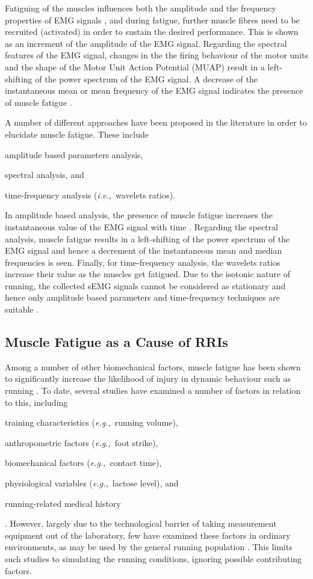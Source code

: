 \documentclass[letterpaper, 10 pt, conference]{ieeeconf}
\newcommand{\il}[1]{\begin{enumerate*}[label=(\roman*),mode=unboxed]#1\end{enumerate*}}
\newcommand{\eg}[1]{\textit{e.g.,}~#1} \newcommand{\ie}[1]{\textit{i.e.,}~#1}
\begin{document}
Fatiguing of the muscles influences both the amplitude and the frequency
properties of EMG signals \cite{de1997use}, and during fatigue, further muscle
fibres need to be recruited (activated) in order to sustain the desired
performance. This is shown as an increment of the amplitude of the EMG signal.
Regarding the spectral features of the EMG signal, changes in the the firing
behaviour of the motor units and the shape of the Motor Unit Action Potential
(MUAP) result in a left-shifting of the power spectrum of the EMG signal. A
decrease of the instantaneous mean or mean frequency of the EMG signal
indicates the presence of muscle fatigue \cite{de1997use}.

A number of different approaches have been proposed in the literature in order
to elucidate muscle fatigue. These include 
\il{
	\item amplitude based parameters analysis, 
	\item spectral analysis, and 
	\item time-frequency analysis (\ie{wavelets ratios}).
} 
In amplitude based analysis,
the presence of muscle fatigue increases the instantaneous value of the EMG
signal with time \cite{gonzalez2012electromyographic}. Regarding the spectral
analysis, muscle fatigue results in a left-shifting of the power spectrum of
the EMG signal and hence a decrement of the instantaneous mean and median
frequencies is seen. Finally, for time-frequency analysis, the wavelets ratios
increase their value as the muscles get fatigued. Due to the isotonic nature of running, the collected sEMG signals cannot be considered as stationary and hence only amplitude based parameters and time-frequency techniques are suitable \cite{gonzalez2012electromyographic}.



\subsection{Muscle Fatigue as a Cause of RRIs}\label{ss:rris}
Among a number of other biomechanical factors, muscle fatigue has been shown to
significantly increase the likelihood of injury in dynamic behaviour such as
running \cite{apps2014individual}. To date, 
several studies have examined a number of factors in relation to this, including 
\il{
\item training characteristics (\eg{running volume}), 
\item anthropometric factors (\eg{foot strike}), 
\item biomechanical factors (\eg{contact time}), 
\item physiological variables (\eg{lactose level}), and
\item running-related medical history
}
\cite{saragiotto2014main}. However, largely due to the technological barrier of
taking measurement equipment out of the laboratory, few have examined these
factors in ordinary environments, as may be used by the general running
population \cite{tillman2002shoe}. This limits such studies to
simulating the running conditions, ignoring possible contributing factors.
\end{document}
